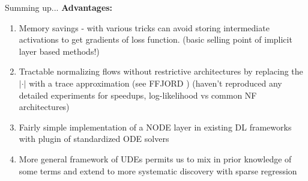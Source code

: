 \documentclass[usenames,dvipsnames]{beamer}
\theoremstyle{definition}
\let\oldcite=\cite
\renewcommand{\cite}[2][]{\textcolor{green}{\oldcite[#1]{#2}}}
\begin{document}
\begin{frame}{Summing up...}
\textbf{Advantages:}

\begin{enumerate}
\item Memory savings - with various tricks can avoid storing intermediate activations to get gradients of loss function.
(basic selling point of implicit layer based methods!)

\item Tractable normalizing flows without restrictive architectures by replacing the $|\cdot|$ with a trace approximation (see FFJORD \cite{grathwohl_ffjord:_2018}) (haven't reproduced any detailed experiments for speedups, log-likelihood vs common NF architectures)

\item Fairly simple implementation of a NODE layer in existing DL frameworks with plugin of standardized ODE solvers 

\item More general framework of UDEs permits us to mix in prior knowledge of some terms and extend to more systematic discovery with sparse regression
\end{enumerate}
\end{frame}




\end{document}
